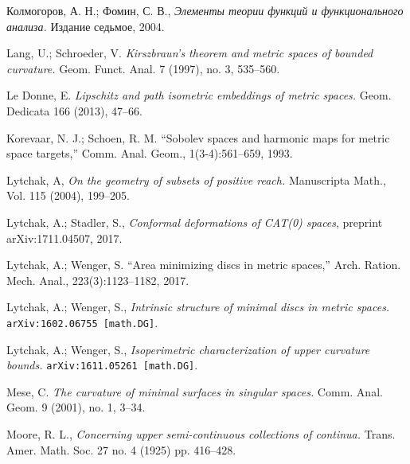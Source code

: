 \documentclass{article}
\begin{document}
\begin{thebibliography}{52}

\begin{otherlanguage}{russian}
Колмогоров, А. Н.;
Фомин, С. В.,
\textit{Элементы теории функций и функционального анализа.}
Издание седьмое, 2004.
\end{otherlanguage}





 Lang, U.; Schroeder, V.
\textit{Kirszbraun's theorem and metric spaces of bounded curvature.}
Geom. Funct. Anal. 7 (1997), no. 3, 535--560. 

 Le Donne, E.
\textit{Lipschitz and path isometric embeddings of metric spaces.} 
Geom. Dedicata 166 (2013), 47--66.

Korevaar, N. J.; Schoen, R. M. ``Sobolev spaces and harmonic maps for metric space targets,'' Comm. Anal. Geom., 1(3-4):561--659, 1993.

 Lytchak, A, 
\textit{On the geometry of subsets of positive reach.} 
Manuscripta Math., Vol. 115 (2004), 199--205. 


 Lytchak, A.; Stadler, S.,  \textit{Conformal deformations of CAT(0) spaces}, preprint arXiv:1711.04507, 2017.


Lytchak, A.; Wenger, S. ``Area minimizing discs in metric spaces,'' Arch. Ration. Mech. Anal., 223(3):1123--1182, 2017.


Lytchak, A.; Wenger, S.,
\textit{Intrinsic structure of minimal discs in metric spaces.} 
\texttt{arXiv:1602.06755 [math.DG]}.


 Lytchak, A.; Wenger, S.,  
\textit{Isoperimetric  characterization  of  upper  curvature bounds.}
\texttt{arXiv:1611.05261 [math.DG]}.

 Mese, C.
\textit{The curvature of minimal surfaces in singular spaces.}
Comm. Anal. Geom. 9 (2001), no. 1, 3--34. 

Moore, R. L.,
\textit{Concerning upper semi-continuous collections of continua.}
Trans. Amer. Math. Soc. 27 no. 4 (1925) pp. 416--428.


\end{thebibliography}
\end{document}
